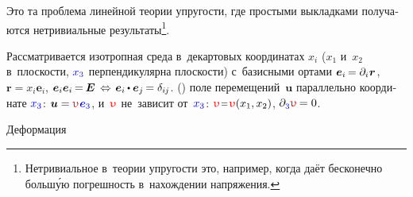 \begin{otherlanguage}{russian}

\newcommand\antiplanedisplacement{\mathcolor{red}{\upupsilon}}

Это та проблема линейной теории упругости, где простыми выкладками получаются нетривиальные результаты\footnote{Нетривиальное в~теории упругости это, например, когда  даёт бесконечно больш\'{у}ю погрешность в~нахождении напряжения.}\hbox{\hspace{-1ex}.}

Рассматривается изотропная среда в~декартовых координатах $x_i$ ($x_1$ и~$x_2$ в~плоскости, $\mathcolor{blue}{x_3}$ перпендикулярна плоскости)
с~базисными ортами
${\bm{e}_i \hspace{-0.2ex} = \partial_i \hspace{.1ex} \bm{r}}$\hbox{\hspace{-0.12ex},}
${\bm{r} = x_i \bm{e}_i}$,
${\bm{e}_i \bm{e}_i \hspace{-0.2ex} = \hspace{-0.15ex} \bm{E} \,\Leftrightarrow\hspace{.25ex} \bm{e}_i \hspace{-0.1ex} \dotp \bm{e}_j \hspace{-0.2ex} = \delta_{i\hspace{-0.1ex}j}}$.
  () поле перемещений~$\bm{u}$ параллельно координате $\mathcolor{blue}{x_3}$:
${\bm{u} = \antiplanedisplacement \hspace{.12ex} \mathcolor{blue}{\bm{e}_3}}$, и~$\antiplanedisplacement$ не~зависит от~$\mathcolor{blue}{x_3}$: ${\antiplanedisplacement \narroweq \antiplanedisplacement(x_1, x_2)}$, ${\partial_{\raisemath{-0.15ex}{\mathcolor{blue}{3}}} \antiplanedisplacement \hspace{-0.15ex} = 0}$.

Деформация


\end{otherlanguage}
